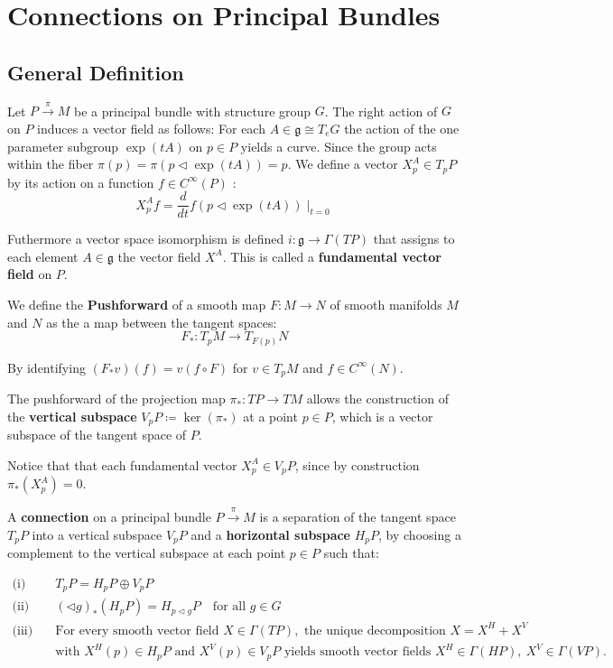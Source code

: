 
\section{Connections on Principal Bundles}

\subsection{General Definition}

Let \( P \xrightarrow{\pi} M \) be a principal bundle with structure group \( G \).
The right action of \( G \) on \(P \) induces a vector field as follows:
For each \( A \in \mathfrak{g} \cong T_eG \) the action of the one parameter subgroup \( \exp(tA) \) on \( p \in P \) yields a curve. Since the group acts within the fiber \( \pi(p) = \pi(p \triangleleft \exp(tA)) = p \). We define a vector \( X^A_p \in T_pP \) by its action on a function \( f \in C^\infty(P) \) \cite{NakaharaGeometrytopologyphysics2005}:
\[ X^A_p f = \frac{d}{dt} f(p \triangleleft \exp(tA))\mid_{t=0} \]

Futhermore a vector space isomorphism is defined \( i: \mathfrak{g} \longrightarrow \Gamma(TP) \) that assigns to each element \( A \in \mathfrak{g} \) the vector field \( X^A \). This is called a \textbf{fundamental vector field} on \( P \).

We define the \textbf{Pushforward} \cite{Pushforward2025} of a smooth map \( F:M \longrightarrow N \) of smooth manifolds \( M \) and \( N \) as the a map between the tangent spaces:
\[ F_* : T_pM \longrightarrow T_{F(p)}N \]

By identifying \( (F_*v)(f) = v(f\circ F) \) for \( v \in T_pM \) and \( f \in C^\infty(N) \).

The pushforward of the projection map \( \pi_* : TP \longrightarrow TM \) allows the construction of the \textbf{vertical subspace} \( V_pP \coloneq \ker(\pi_*) \) at a point \( p \in P \), which is a vector subspace of the tangent space of \( P \).

Notice that that each fundamental vector \( X^A_p \in V_pP \), since by construction \( \pi_* (X^A_p) = 0 \).


A \textbf{connection} on a principal bundle \( P \xrightarrow{\pi} M \) is a separation of the tangent space \( T_pP \) into a vertical subspace \( V_pP \) and a \textbf{horizontal subspace} \( H_pP \), by choosing a complement to the vertical subspace at each point \( p \in P \) such that:

\begin{align*}
  \text{(i)}\quad 
    & T_pP = H_pP \oplus V_pP \\
  \text{(ii)}\quad 
    & (\triangleleft g)_* (H_pP) = H_{p \triangleleft g}P 
    \quad \text{for all } g \in G \\
  \text{(iii)}\quad 
    & \text{For every smooth vector field } X \in \Gamma(TP), \text{ the unique decomposition } 
      X = X^H + X^V \\
    & \text{with } X^H(p) \in H_pP \text{ and } X^V(p) \in V_pP \text{ yields smooth vector fields } 
      X^H \in \Gamma(HP),\ X^V \in \Gamma(VP).
\end{align*}


